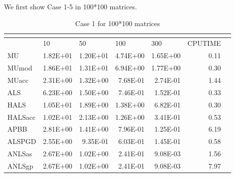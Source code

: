 \documentclass{article}
\begin{document}
We first show Case 1-5 in 100*100 matrices.
\begin{table}[H]
	\caption{Case 1 for 100*100 matrices}
	\centering
	\begin{tabular}{|l|r|r|r|r|r|l|}
		\hline
		& \multicolumn{1}{l|}{}   & \multicolumn{1}{l|}{}   & \multicolumn{1}{l|}{}    & \multicolumn{1}{l|}{}    & \multicolumn{1}{l|}{}        &  \\ \hline
		& \multicolumn{1}{l|}{10} & \multicolumn{1}{l|}{50} & \multicolumn{1}{l|}{100} & \multicolumn{1}{l|}{300} & \multicolumn{1}{l|}{CPUTIME} &  \\ \hline
		MU       & 1.82E+01                & 1.20E+01                & 4.74E+00                 & 1.65E+00                 & 0.11                         &  \\ \hline
		MUmod    & 1.86E+01                & 1.31E+01                & 6.94E+00                 & 1.77E+00                 & 0.30                         &  \\ \hline
		MUacc    & 2.31E+00                & 1.32E+00                & 7.68E-01                 & 2.74E-01                 & 1.44                         &  \\ \hline
		ALS      & 6.23E+00                & 1.50E+00                & 7.46E-01                 & 1.52E-01                 & 0.33                         &  \\ \hline
		HALS     & 1.05E+01                & 1.89E+00                & 1.38E+00                 & 6.82E-01                 & 0.30                         &  \\ \hline
		HALSacc  & 1.02E+01                & 2.13E+00                & 1.26E+00                 & 3.41E-01                 & 0.53                         &  \\ \hline
		APBB     & 2.81E+00                & 1.41E+00                & 7.96E-01                 & 1.25E-01                 & 6.19                         &  \\ \hline
		ALSPGD   & 2.55E+00                & 9.35E-01                & 6.03E-01                 & 1.45E-01                 & 0.58                         &  \\ \hline
		ANLSas   & 2.67E+00                & 1.02E+00                & 2.41E-01                 & 9.08E-03                 & 1.56                         &  \\ \hline
		ANLSgp   & 2.67E+00                & 1.02E+00                & 2.41E-01                 & 9.08E-03                 & 7.97                         &  \\ \hline

\end{tabular}
\end{table}
\end{document}
